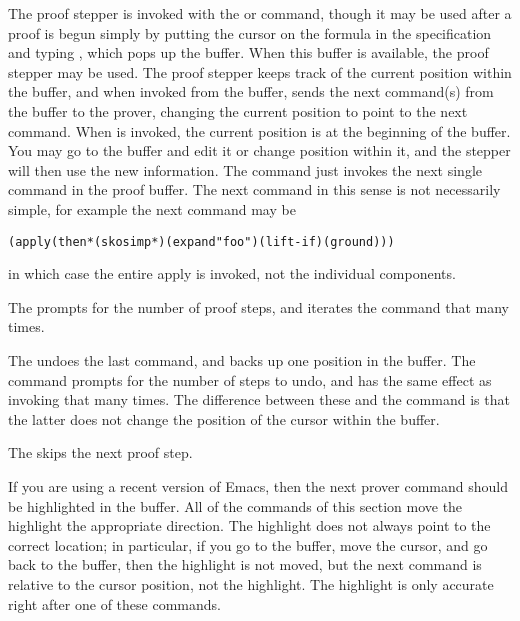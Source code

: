 The proof stepper is invoked with the  or
 command, though it may be used after a proof is begun
simply by putting the cursor on the formula in the specification and
typing , which pops up the  buffer.  When
this buffer is available, the proof stepper may be used.  The
proof stepper keeps track of the current position within the 
buffer, and when invoked from the  buffer, sends the next
command(s) from the  buffer to the prover, changing the
current position to point to the next command.  When  is
invoked, the current position is at the beginning of the buffer.  You may
go to the  buffer and edit it or change position within it,
and the stepper will then use the new information.  The
 command just invokes the next single
command in the proof buffer.  The next command in this sense is not
necessarily simple, for example the next command may be {\small
\begin{alltt}
  (apply (then* (skosimp*) (expand "foo") (lift-if) (ground)))
\end{alltt}}
\noindent in which case the entire apply is invoked, not the individual
components.

The  prompts for the number of proof
steps, and iterates the  command that many
times.

The  undoes the last command, and
backs up one position in the  buffer.  The
 command prompts for the number of
steps to undo, and has the same effect as invoking
 that many times.  The difference
between these and the  command is that the latter
does not change the position of the cursor within the  buffer.

The  skips the next proof step.

If you are using a recent version of Emacs, then the next prover
command should be highlighted in the  buffer.  All of the
commands of this section move the highlight the appropriate direction.
The highlight does not always point to the correct location; in
particular, if you go to the  buffer, move the cursor, and go
back to the  buffer, then the highlight is not moved, but
the next command is relative to the cursor position, not the highlight.
The highlight is only accurate right after one of these commands.

